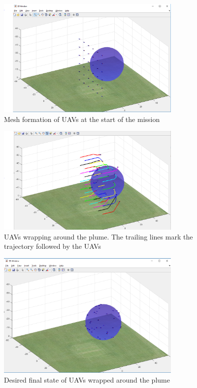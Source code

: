 \begin{figure}[hbtp]
\centering
\includegraphics[width=0.8\textwidth]{Chapter-3/figs/initial_drone_config}
\caption{Mesh formation of UAVs at the start of the mission}
\label{fig:mesh_formation}
\end{figure}

\begin{figure}[hbtp]
\centering
\includegraphics[width=0.8\textwidth]{Chapter-3/figs/intermediate_state}
\caption{UAVs wrapping around the plume. The trailing lines mark the trajectory followed by the UAVs}
\label{fig:intermediate_state}
\end{figure}

\begin{figure}[hbtp]
\centering
\includegraphics[width=0.8\textwidth]{Chapter-3/figs/final_formation}
\caption{Desired final state of UAVs wrapped around the plume}
\label{fig:final_state}
\end{figure}


